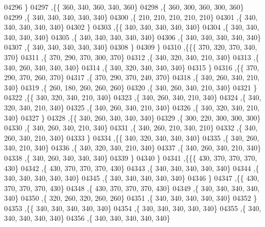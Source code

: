 \begin{DoxyCode}
04296     \}
04297    ,\{\{   360,   340,   360,   340,   360\}
04298     ,\{   360,   300,   360,   300,   360\}
04299     ,\{   340,   340,   340,   340,   340\}
04300     ,\{   210,   210,   210,   210,   210\}
04301     ,\{   340,   340,   340,   340,   340\}
04302     \}
04303    ,\{\{   340,   340,   340,   340,   340\}
04304     ,\{   340,   340,   340,   340,   340\}
04305     ,\{   340,   340,   340,   340,   340\}
04306     ,\{   340,   340,   340,   340,   340\}
04307     ,\{   340,   340,   340,   340,   340\}
04308     \}
04309    \}
04310   ,\{\{\{   370,   320,   370,   340,   370\}
04311     ,\{   370,   290,   370,   300,   370\}
04312     ,\{   340,   320,   340,   210,   340\}
04313     ,\{   340,   260,   340,   340,   340\}
04314     ,\{   340,   320,   340,   340,   340\}
04315     \}
04316    ,\{\{   370,   290,   370,   260,   370\}
04317     ,\{   370,   290,   370,   240,   370\}
04318     ,\{   340,   260,   340,   210,   340\}
04319     ,\{   260,   180,   260,   260,   260\}
04320     ,\{   340,   260,   340,   210,   340\}
04321     \}
04322    ,\{\{   340,   320,   340,   210,   340\}
04323     ,\{   340,   260,   340,   210,   340\}
04324     ,\{   340,   320,   340,   210,   340\}
04325     ,\{   340,   260,   340,   210,   340\}
04326     ,\{   340,   320,   340,   210,   340\}
04327     \}
04328    ,\{\{   340,   260,   340,   340,   340\}
04329     ,\{   300,   220,   300,   300,   300\}
04330     ,\{   340,   260,   340,   210,   340\}
04331     ,\{   340,   260,   210,   340,   210\}
04332     ,\{   340,   260,   340,   210,   340\}
04333     \}
04334    ,\{\{   340,   320,   340,   340,   340\}
04335     ,\{   340,   260,   340,   210,   340\}
04336     ,\{   340,   320,   340,   210,   340\}
04337     ,\{   340,   260,   340,   210,   340\}
04338     ,\{   340,   260,   340,   340,   340\}
04339     \}
04340    \}
04341   ,\{\{\{   430,   370,   370,   370,   430\}
04342     ,\{   430,   370,   370,   370,   430\}
04343     ,\{   340,   340,   340,   340,   340\}
04344     ,\{   340,   340,   340,   340,   340\}
04345     ,\{   340,   340,   340,   340,   340\}
04346     \}
04347    ,\{\{   430,   370,   370,   370,   430\}
04348     ,\{   430,   370,   370,   370,   430\}
04349     ,\{   340,   340,   340,   340,   340\}
04350     ,\{   320,   260,   320,   260,   260\}
04351     ,\{   340,   340,   340,   340,   340\}
04352     \}
04353    ,\{\{   340,   340,   340,   340,   340\}
04354     ,\{   340,   340,   340,   340,   340\}
04355     ,\{   340,   340,   340,   340,   340\}
04356     ,\{   340,   340,   340,   340,   340\}

\end{DoxyCode}
